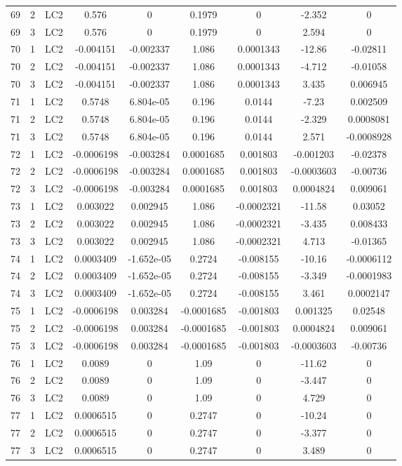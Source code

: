 \documentclass{article}%
\begin{document}
\begin{longtable}{| c c c | c c c c c c |}
69&2&LC2&0.576&0&0.1979&0&{-}2.352&0\\%
69&3&LC2&0.576&0&0.1979&0&2.594&0\\%
70&1&LC2&{-}0.004151&{-}0.002337&1.086&0.0001343&{-}12.86&{-}0.02811\\%
70&2&LC2&{-}0.004151&{-}0.002337&1.086&0.0001343&{-}4.712&{-}0.01058\\%
70&3&LC2&{-}0.004151&{-}0.002337&1.086&0.0001343&3.435&0.006945\\%
71&1&LC2&0.5748&6.804e{-}05&0.196&0.0144&{-}7.23&0.002509\\%
71&2&LC2&0.5748&6.804e{-}05&0.196&0.0144&{-}2.329&0.0008081\\%
71&3&LC2&0.5748&6.804e{-}05&0.196&0.0144&2.571&{-}0.0008928\\%
72&1&LC2&{-}0.0006198&{-}0.003284&0.0001685&0.001803&{-}0.001203&{-}0.02378\\%
72&2&LC2&{-}0.0006198&{-}0.003284&0.0001685&0.001803&{-}0.0003603&{-}0.00736\\%
72&3&LC2&{-}0.0006198&{-}0.003284&0.0001685&0.001803&0.0004824&0.009061\\%
73&1&LC2&0.003022&0.002945&1.086&{-}0.0002321&{-}11.58&0.03052\\%
73&2&LC2&0.003022&0.002945&1.086&{-}0.0002321&{-}3.435&0.008433\\%
73&3&LC2&0.003022&0.002945&1.086&{-}0.0002321&4.713&{-}0.01365\\%
74&1&LC2&0.0003409&{-}1.652e{-}05&0.2724&{-}0.008155&{-}10.16&{-}0.0006112\\%
74&2&LC2&0.0003409&{-}1.652e{-}05&0.2724&{-}0.008155&{-}3.349&{-}0.0001983\\%
74&3&LC2&0.0003409&{-}1.652e{-}05&0.2724&{-}0.008155&3.461&0.0002147\\%
75&1&LC2&{-}0.0006198&0.003284&{-}0.0001685&{-}0.001803&0.001325&0.02548\\%
75&2&LC2&{-}0.0006198&0.003284&{-}0.0001685&{-}0.001803&0.0004824&0.009061\\%
75&3&LC2&{-}0.0006198&0.003284&{-}0.0001685&{-}0.001803&{-}0.0003603&{-}0.00736\\%
76&1&LC2&0.0089&0&1.09&0&{-}11.62&0\\%
76&2&LC2&0.0089&0&1.09&0&{-}3.447&0\\%
76&3&LC2&0.0089&0&1.09&0&4.729&0\\%
77&1&LC2&0.0006515&0&0.2747&0&{-}10.24&0\\%
77&2&LC2&0.0006515&0&0.2747&0&{-}3.377&0\\%
77&3&LC2&0.0006515&0&0.2747&0&3.489&0\\%

\end{longtable}
\end{document}
